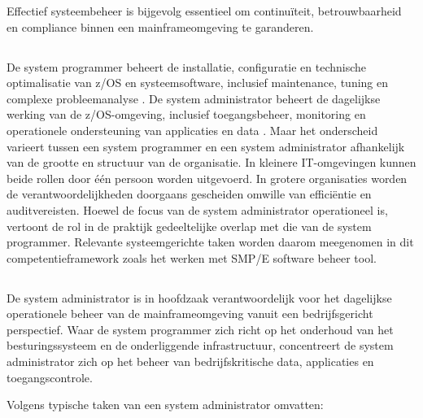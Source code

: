 Effectief systeembeheer is bijgevolg essentieel om continuïteit, betrouwbaarheid en compliance binnen een mainframeomgeving te garanderen.

\subsection{}
\label{sec:verschil-sysadmin-sysprog}
De system programmer beheert de installatie, configuratie en technische optimalisatie van z/OS en systeemsoftware, inclusief maintenance, tuning en complexe probleemanalyse \autocite{IBM_zOS_Concepts}.
De system administrator beheert de dagelijkse werking van de z/OS-omgeving, inclusief toegangsbeheer, monitoring en operationele ondersteuning van applicaties en data \autocite{IBM_zOS_Concepts}.
Maar het onderscheid varieert tussen een system programmer en een system administrator afhankelijk van de grootte en structuur van de organisatie. In kleinere IT-omgevingen kunnen beide rollen door één persoon worden uitgevoerd. In grotere organisaties worden de verantwoordelijkheden doorgaans gescheiden omwille van efficiëntie en auditvereisten. 
Hoewel de focus van de system administrator operationeel is, vertoont de rol in de praktijk gedeeltelijke overlap met die van de system programmer. Relevante systeemgerichte taken worden daarom meegenomen in dit competentieframework zoals het werken met SMP/E software beheer tool.

\subsection{}
\label{sec:rol-van-een-system-administrator-in-zos-context}
De system administrator is in hoofdzaak verantwoordelijk voor het dagelijkse operationele beheer van de mainframeomgeving vanuit een bedrijfsgericht perspectief. Waar de system programmer zich richt op het onderhoud van het besturingssysteem en de onderliggende infrastructuur, concentreert de system administrator zich op het beheer van bedrijfskritische data, applicaties en toegangscontrole. \autocite{IBM_zOS_Concepts}

Volgens \autocite{IBM_zOS_Concepts} typische taken van een system administrator omvatten:

